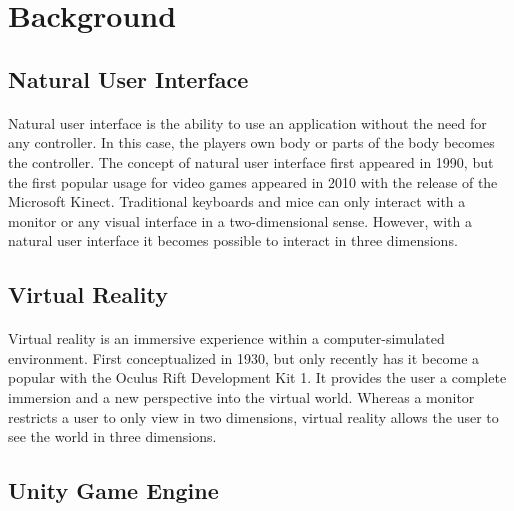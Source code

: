 

\usepackage{graphicx}
\usepackage{float}
\usepackage{array} 



\maketitle

\section{Background}

\subsection{Natural User Interface}

\paragraph{} Natural user interface is the ability to use an application without the need for any controller. In this case, the players own body or parts of the body becomes the controller. The concept of natural user interface first appeared in 1990, but the first popular usage for video games appeared in 2010 with the release of the Microsoft Kinect. Traditional keyboards and mice can only interact with a monitor or any visual interface in a two-dimensional sense. However, with a natural user interface it becomes possible to interact in three dimensions.

\subsection{Virtual Reality}

\paragraph{} Virtual reality is an immersive experience within a computer-simulated environment. First conceptualized in 1930, but only recently has it become a popular with the Oculus Rift Development Kit 1. It provides the user a complete immersion and a new perspective into the virtual world. Whereas a monitor restricts a user to only view in two dimensions, virtual reality allows the user to see the world in three dimensions.

\subsection{Unity Game Engine}

